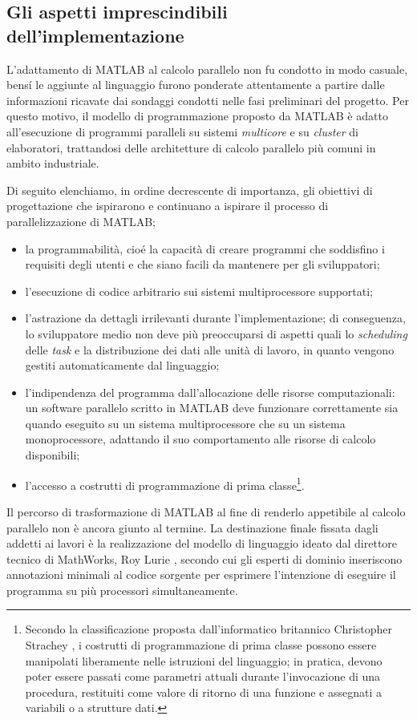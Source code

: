 \subsection{Gli aspetti imprescindibili dell'implementazione}
\label{sec2.1.2}
L'adattamento di MATLAB al calcolo parallelo non fu condotto in modo casuale, bens\'i le aggiunte al linguaggio furono ponderate attentamente a partire dalle informazioni ricavate dai sondaggi condotti nelle fasi preliminari del progetto.\newline
Per questo motivo, il modello di programmazione proposto da MATLAB \`e adatto all'esecuzione di programmi paralleli su sistemi \textit{multicore} e su \textit{cluster} di elaboratori, trattandosi delle architetture di calcolo parallelo pi\`u comuni in ambito industriale.

Di seguito elenchiamo, in ordine decrescente di importanza, gli obiettivi di progettazione che ispirarono e continuano a ispirare il processo di parallelizzazione di MATLAB;
\begin{itemize}
    \item la programmabilit\`a, cio\'e la capacit\`a di creare programmi che soddisfino i requisiti degli utenti e che siano facili da mantenere per gli sviluppatori;
    \item l'esecuzione di codice arbitrario sui sistemi multiprocessore supportati;
    \item l'astrazione da dettagli irrilevanti durante l'implementazione; di conseguenza, lo sviluppatore medio non deve pi\`u preoccuparsi di aspetti quali lo \textit{scheduling} delle \textit{task} e la distribuzione dei dati alle unit\`a di lavoro, in quanto vengono gestiti automaticamente dal linguaggio;
    \item l'indipendenza del programma dall'allocazione delle risorse computazionali: un software parallelo scritto in MATLAB deve funzionare correttamente sia quando eseguito su un sistema multiprocessore che su un sistema monoprocessore, adattando il suo comportamento alle risorse di calcolo disponibili;
    \item l'accesso a costrutti di programmazione di prima classe\footnote{Secondo la classificazione proposta dall'informatico britannico Christopher Strachey \cite{SICP96}, i costrutti di programmazione di prima classe possono essere manipolati liberamente nelle istruzioni del linguaggio; in pratica, devono poter essere passati come parametri attuali durante l'invocazione di una procedura, restituiti come valore di ritorno di una funzione e assegnati a variabili o a strutture dati.}. 
\end{itemize}
Il percorso di trasformazione di MATLAB al fine di renderlo appetibile al calcolo parallelo non \`e ancora giunto al termine. \newline La destinazione finale fissata 
dagli addetti ai lavori \`e la realizzazione del modello di linguaggio ideato dal direttore tecnico di MathWorks, Roy Lurie \cite{Lurie2007},
secondo cui gli esperti di dominio inseriscono annotazioni minimali al codice sorgente per esprimere l'intenzione di eseguire il programma 
su pi\`u processori simultaneamente.
